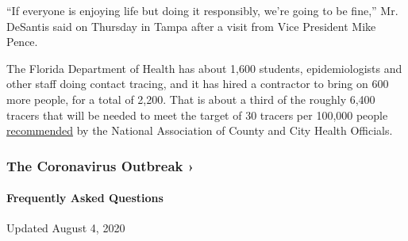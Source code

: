 ``If everyone is enjoying life but doing it responsibly, we're going to
be fine,'' Mr. DeSantis said on Thursday in Tampa after a visit from
Vice President Mike Pence.

The Florida Department of Health has about 1,600 students,
epidemiologists and other staff doing contact tracing, and it has hired
a contractor to bring on 600 more people, for a total of 2,200. That is
about a third of the roughly 6,400 tracers that will be needed to meet
the target of 30 tracers per 100,000 people
\href{https://www.naccho.org/uploads/full-width-images/Contact-Tracing-Statement-4-16-2020.pdf}{recommended}
by the National Association of County and City Health Officials.

\href{https://www.nytimes.com/news-event/coronavirus?action=click\&pgtype=Article\&state=default\&region=MAIN_CONTENT_3\&context=storylines_faq}{}

\hypertarget{the-coronavirus-outbreak-}{%
\subsubsection{The Coronavirus Outbreak
›}\label{the-coronavirus-outbreak-}}

\hypertarget{frequently-asked-questions}{%
\paragraph{Frequently Asked
Questions}\label{frequently-asked-questions}}

Updated August 4, 2020

